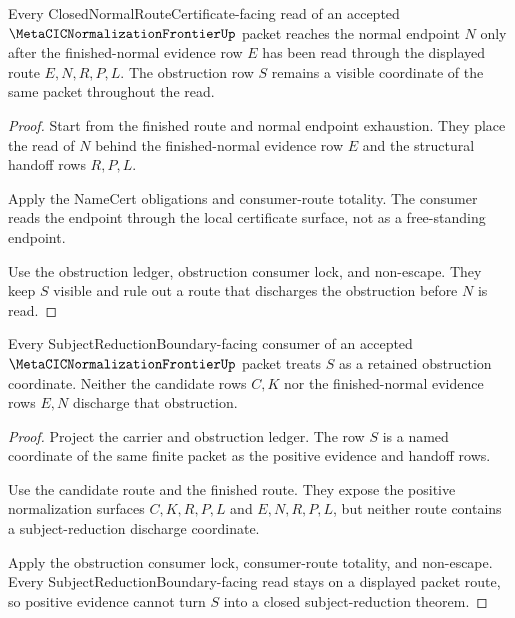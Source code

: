 \begin{theorem}
\label{thm:metacic-normalization-frontier-closed-normal-route-boundary}
Every ClosedNormalRouteCertificate-facing read of an accepted
$\MetaCICNormalizationFrontierUp$ packet reaches the normal endpoint $N$ only
after the finished-normal evidence row $E$ has been read through the displayed
route $E,N,R,P,L$. The obstruction row $S$ remains a visible coordinate of the
same packet throughout the read.
\end{theorem}
\begin{proof}
Start from the finished route and normal endpoint exhaustion. They place the
read of $N$ behind the finished-normal evidence row $E$ and the structural
handoff rows $R,P,L$.

Apply the NameCert obligations and consumer-route totality. The consumer reads
the endpoint through the local certificate surface, not as a free-standing
endpoint.

Use the obstruction ledger, obstruction consumer lock, and non-escape. They
keep $S$ visible and rule out a route that discharges the obstruction before
$N$ is read.
\end{proof}

\begin{theorem}
\label{thm:metacic-normalization-frontier-subject-reduction-obstruction-compatibility}
Every SubjectReductionBoundary-facing consumer of an accepted
$\MetaCICNormalizationFrontierUp$ packet treats $S$ as a retained obstruction
coordinate. Neither the candidate rows $C,K$ nor the finished-normal evidence
rows $E,N$ discharge that obstruction.
\end{theorem}
\begin{proof}
Project the carrier and obstruction ledger. The row $S$ is a named coordinate
of the same finite packet as the positive evidence and handoff rows.

Use the candidate route and the finished route. They expose the positive
normalization surfaces $C,K,R,P,L$ and $E,N,R,P,L$, but neither route contains
a subject-reduction discharge coordinate.

Apply the obstruction consumer lock, consumer-route totality, and non-escape.
Every SubjectReductionBoundary-facing read stays on a displayed packet route,
so positive evidence cannot turn $S$ into a closed subject-reduction theorem.
\end{proof}

